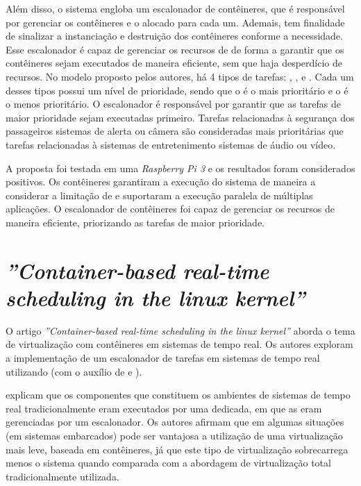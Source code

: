 Além disso, o sistema engloba um escalonador de contêineres, que é responsável por gerenciar os contêineres e o \hardware alocado para cada um. Ademais, tem finalidade de sinalizar a instanciação e destruição dos contêineres conforme a necessidade. Esse escalonador é capaz de gerenciar os recursos de \hardware de forma a garantir que os contêineres sejam executados de maneira eficiente, sem que haja desperdício de recursos. No modelo proposto pelos autores, há 4 tipos de tarefas: \critical, \high, \moderate e \low. Cada um desses tipos possui um nível de prioridade, sendo que o \critical é o mais prioritário e o \low é o menos prioritário. O escalonador é responsável por garantir que as tarefas de maior prioridade sejam executadas primeiro. Tarefas relacionadas à segurança dos passageiros \eg sistemas de alerta ou câmera são consideradas mais prioritárias que tarefas relacionadas à sistemas de entretenimento \eg sistemas de áudio ou vídeo.

A proposta foi testada em uma \textit{Raspberry Pi 3} e os resultados foram considerados positivos. Os contêineres garantiram a execução do sistema de maneira a considerar a limitação de \hardware e suportaram a execução paralela de múltiplas aplicações. O escalonador de contêineres foi capaz de gerenciar os recursos de maneira eficiente, priorizando as tarefas de maior prioridade.

\section{\textit{''Container-based real-time scheduling in the linux kernel''}}

O artigo \textit{''Container-based real-time scheduling in the linux kernel''} \cite{abeni2019container} aborda o tema de virtualização com contêineres em sistemas de tempo real. Os autores exploram a implementação de um escalonador de tarefas em sistemas de tempo real utilizando \lxc (\ie com o auxílio de \cgroups e \namespaces). 

 explicam que os componentes que constituem os ambientes de sistemas de tempo real tradicionalmente eram executados por uma \vm dedicada, em que as \vms eram gerenciadas por um \hypervisor escalonador. Os autores afirmam que em algumas situações (\eg em sistemas embarcados) pode ser vantajosa a utilização de uma virtualização mais leve, baseada em contêineres, já que este tipo de virtualização sobrecarrega menos o sistema quando comparada com a abordagem de virtualização total tradicionalmente utilizada.

